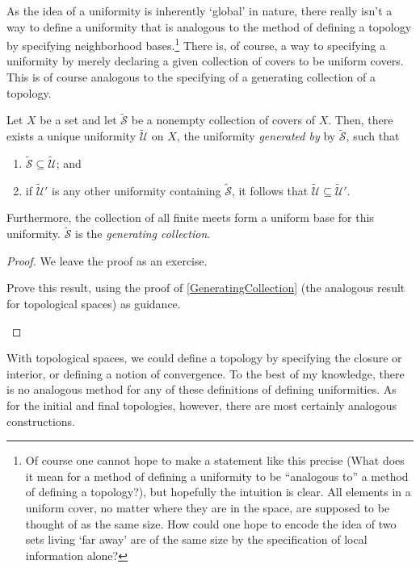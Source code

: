 As the idea of a uniformity is inherently `global' in nature, there really isn't a way to define a uniformity that is analogous to the method of defining a topology by specifying neighborhood bases.\footnote{Of course one cannot hope to make a statement like this precise (What does it mean for a method of defining a uniformity to be ``analogous to'' a method of defining a topology?), but hopefully the intuition is clear.  All elements in a uniform cover, no matter where they are in the space, are supposed to be thought of as the same size.  How could one hope to encode the idea of two sets living `far away' are of the same size by the specification of local information alone?}  There is, of course, a way to specifying a uniformity by merely declaring a given collection of covers to be uniform covers.  This is of course analogous to the specifying of a generating collection of a topology.
\begin{prp}
Let $X$ be a set and let $\widetilde{\mathcal{S}}$ be a nonempty collection of covers of $X$.  Then, there exists a unique uniformity $\widetilde{\mathcal{U}}$ on $X$, the uniformity \emph{generated by} by $\widetilde{\mathcal{S}}$, such that
\begin{enumerate}
\item $\widetilde{\mathcal{S}}\subseteq \widetilde{\mathcal{U}}$; and
\item if $\widetilde{\mathcal{U}}'$ is any other uniformity containing $\widetilde{\mathcal{S}}$, it follows that $\widetilde{\mathcal{U}}\subseteq \widetilde{\mathcal{U}}'$.
\end{enumerate}
Furthermore, the collection of all finite meets form a uniform base for this uniformity.  $\widetilde{\mathcal{S}}$ is the \emph{generating collection}.
\begin{proof}
We leave the proof as an exercise.
\begin{exr}
Prove this result, using the proof of \cref{GeneratingCollection} (the analogous result for topological spaces) as guidance.
\end{exr}
\end{proof}
\end{prp}
With topological spaces, we could define a topology by specifying the closure or interior, or defining a notion of convergence.  To the best of my knowledge, there is no analogous method for any of these definitions of defining uniformities.  As for the initial and final topologies, however, there are most certainly analogous constructions.

